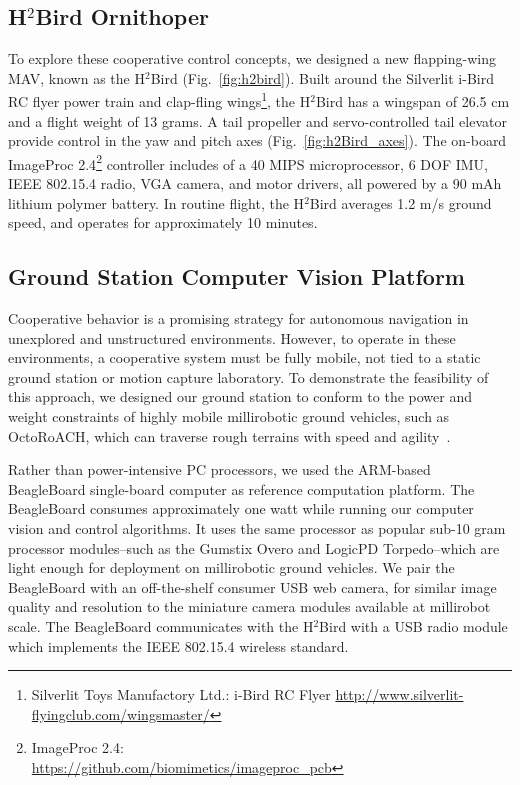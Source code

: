 \documentclass{aamas2013}
\begin{document}
\subsection{H$^2$Bird Ornithoper}
To explore these cooperative control concepts, we designed a new 
flapping-wing MAV, known as the H$^2$Bird (Fig.~\ref{fig:h2bird}). Built 
around the Silverlit i-Bird RC flyer power train and clap-fling wings\footnote{\raggedright Silverlit Toys Manufactory Ltd.: i-Bird RC Flyer
\href{http://www.silverlit-flyingclub.com/wingsmaster/}
     {http://www.silverlit-flyingclub.com/wingsmaster/}}, 
the H$^2$Bird has a wingspan of 26.5 cm and a flight weight of 13 grams. A 
tail propeller and servo-controlled tail elevator provide control in the yaw 
and pitch axes (Fig.~\ref{fig:h2Bird_axes}). The on-board ImageProc 2.4\footnote{ImageProc 2.4: \\
\href{https://github.com/biomimetics/imageproc\_pcb}
     {https://github.com/biomimetics/imageproc\_pcb}} 
controller includes of a 40 MIPS microprocessor, 6 DOF IMU, 
IEEE 802.15.4 radio, VGA camera, and motor drivers, all powered by a 90 mAh 
lithium polymer battery. In routine flight, the H$^2$Bird averages 1.2 m/s 
ground speed, and operates for approximately 10 minutes.

\subsection{Ground Station Computer Vision Platform}
Cooperative behavior is a promising strategy for autonomous navigation in 
unexplored and unstructured environments. However, to operate in these 
environments, a cooperative system must be fully mobile, not tied to a 
static ground station or motion capture laboratory. To demonstrate the 
feasibility of this approach, we designed our ground station to conform to 
the power and weight constraints of highly mobile millirobotic ground 
vehicles, such as OctoRoACH, which can traverse rough terrains with speed and 
agility~\cite{Pullin2012Dynamic}. 

Rather than power-intensive PC processors, we used the ARM-based BeagleBoard 
single-board computer as reference computation platform. The BeagleBoard 
consumes approximately one watt while running our computer vision and 
control algorithms. It uses the same processor as popular sub-10 gram 
processor modules--such as the Gumstix Overo and LogicPD Torpedo--which are 
light enough for deployment on millirobotic ground vehicles. We pair the 
BeagleBoard with an off-the-shelf consumer USB web camera, for similar image 
quality and resolution to the miniature camera modules available at 
millirobot scale. The BeagleBoard communicates with the H$^2$Bird with a 
USB radio module which implements the IEEE 802.15.4 wireless standard.
\end{document}
